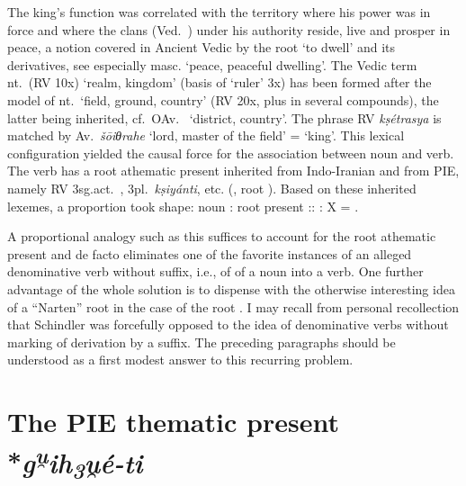 \documentclass[output=paper,colorlinks,citecolor=brown]{langscibook}
\begin{document}
The king’s function was correlated with the territory where his power was in force and where the clans (Ved.\  ) under his authority reside, live and prosper in peace, a notion covered in Ancient Vedic by the root  ‘to dwell’ and its derivatives, see especially  masc. ‘peace, peaceful dwelling’. The Vedic term  nt.\ (RV 10x) ‘realm, kingdom’ (basis of  ‘ruler’ 3x) has been formed after the model of  nt.\ ‘field, ground, country’ (RV 20x, plus in several compounds), the latter being inherited, cf.\  OAv.\   ‘district, country’. The phrase RV \textit{kṣétrasya}  is matched by Av.\  \textit{šōiθrahe}  ‘lord, master of the field’ = ‘king’. This lexical configuration yielded the causal force for the association between noun and verb. The verb  has a root athematic present  inherited from Indo-Iranian and from PIE, namely RV 3sg.act.\ , 3pl.\ \textit{kṣiyánti}, etc. (, root ). Based on these inherited lexemes, a proportion took shape: noun  : root present  ::  : X = . 

A proportional analogy such as this suffices to account for the root athematic present  and de facto eliminates one of the favorite instances of an alleged denominative verb without suffix, i.e., of  of a noun into a verb. One further advantage of the whole solution is to dispense with the otherwise interesting idea of a “Narten” root in the case of the root . I may recall from personal recollection that Schindler was forcefully opposed to the idea of denominative verbs without marking of derivation by a suffix. The preceding paragraphs should be understood as a first modest answer to this recurring problem. 

\section{The PIE thematic present *\emph{g\textsuperscript{u̯}ih\textsubscript{3}u̯é-ti}}
\end{document}
